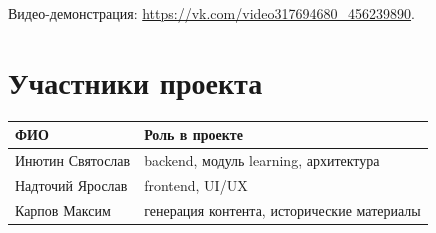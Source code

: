 \documentclass[12pt,a4paper]{article}
\begin{document}
Видео-демонстрация: \url{https://vk.com/video317694680_456239890}.

\section{Участники проекта}

\begin{longtable}{|p{5cm}|p{8cm}|}
\hline
ФИО & Роль в проекте \\
\hline
Инютин Святослав & backend, модуль learning, архитектура \\
\hline
Надточий Ярослав & frontend, UI/UX \\
\hline
Карпов Максим & генерация контента, исторические материалы \\
\hline
\end{longtable}
\end{document}
